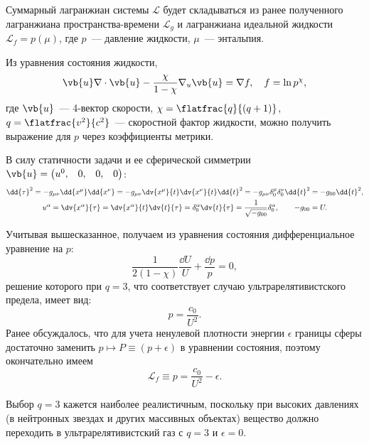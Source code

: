\documentclass[\docroot/reports/draft/report.tex]{subfiles}
\begin{document}
    Суммарный лагранжиан системы $\mathcal{L}$ будет складываться из ранее полученного лагранжиана пространства-времени $\mathcal{L}_g$ и лагранжиана идеальной жидкости $\mathcal{L}_f = p(\mu)$, где $p$~--- давление жидкости, $\mu$~--- энтальпия.

    Из уравнения состояния жидкости,
    \begin{equation*}
        \vb{u} \nabla \cdot \vb{u} - \frac{\chi}{1 - \chi} \nabla_u \vb{u} = \nabla f , \quad f = \ln p^{\chi} ,
    \end{equation*}
    где $\vb{u}$~--- 4-вектор скорости, $\chi = \flatfrac{q}{(q+1)}$, $q = \flatfrac{v^2}{c^2}$~--- скоростной фактор жидкости, можно получить выражение для $p$ через коэффициенты метрики.

    В силу статичности задачи и ее сферической симметрии $\vb{u} = \begin{pmatrix}u^0,&0,&0,&0\end{pmatrix}$:
    \begin{gather*}
        \dd{\tau}^2 = - g_{\mu\nu} \dd{x^\mu}\dd{x^\nu} = - g_{\mu\nu} \dv{x^\mu}{t} \dv{x^\nu}{t} \dd{t}^2 = - g_{\mu\nu} \delta^\mu_0 \delta^\nu_0 \dd{t}^2 = - g_{00} \dd{t}^2 , \\
        u^\alpha = \dv{x^\alpha}{\tau} = \dv{x^\alpha}{t} \dv{t}{\tau} = \delta^\alpha_0 \dv{t}{\tau} = \frac{1}{\sqrt{- g_{00}}} \delta^\alpha_0 , \qquad - g_{00} = U .
    \end{gather*}

    Учитывая вышесказанное, получаем из уравнения состояния дифференциальное уравнение на $p$:
    \begin{equation*}
        \frac{1}{2 (1 - \chi)} \frac{\dd{U}}{U} + \frac{\dd{p}}{p} = 0 ,
    \end{equation*}
    решение которого при $q = 3$, что соответствует случаю ультрарелятивистского предела, имеет вид:
    \begin{equation*}
        p = \frac{c_0}{U^2} .
    \end{equation*}
    Ранее обсуждалось, что для учета ненулевой плотности энергии $\epsilon$ границы сферы достаточно заменить $p \mapsto P \equiv (p + \epsilon)$ в уравнении состояния, поэтому окончательно имеем
    \begin{equation*}
        \mathcal{L}_f \equiv p = \frac{c_0}{U^2} - \epsilon .
    \end{equation*}

    Выбор $q = 3$ кажется наиболее реалистичным, поскольку при высоких давлениях (в нейтронных звездах и других массивных объектах) вещество должно переходить в ультрарелятивистский газ \cite{oppenheimer_volkoff,burlankov_new_phys} с $q = 3$ и $\epsilon = 0$.
\end{document}
